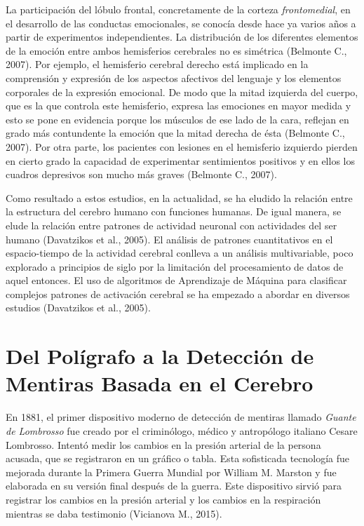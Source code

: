 La participación del lóbulo frontal, concretamente de la corteza \textit{frontomedial}, en el desarrollo de las conductas  emocionales, se conocía  desde  hace ya varios años a partir de experimentos independientes. La distribución de los diferentes elementos de la emoción entre ambos hemisferios cerebrales no es simétrica (Belmonte C., 2007). Por ejemplo, el hemisferio cerebral derecho está implicado en la comprensión y expresión de los aspectos afectivos del lenguaje y los elementos corporales de la expresión emocional. De modo que la mitad izquierda del cuerpo, que es la que controla  este  hemisferio,  expresa  las  emociones en mayor medida y esto se pone en evidencia porque los músculos de ese lado de la cara, reflejan en grado más contundente la emoción que la mitad derecha de ésta (Belmonte C., 2007). Por otra parte, los pacientes con lesiones en el hemisferio izquierdo pierden en cierto grado la capacidad  de  experimentar sentimientos  positivos  y  en  ellos  los  cuadros  depresivos son mucho más graves (Belmonte C., 2007).

Como resultado a estos estudios, en la actualidad, se ha eludido la relación entre la estructura del cerebro humano con funciones humanas. De igual manera, se elude la relación entre patrones de actividad neuronal con actividades del ser humano (Davatzikos et al., 2005). El análisis de patrones cuantitativos en el espacio-tiempo de la actividad cerebral conlleva a un análisis multivariable, poco explorado a principios de siglo por la limitación del procesamiento de datos de aquel entonces. El uso de algoritmos de Aprendizaje de Máquina para clasificar complejos patrones de activación cerebral se ha empezado a abordar en diversos estudios (Davatzikos et al., 2005).

\section{Del Polígrafo a la Detección de Mentiras Basada en el Cerebro}
En 1881, el primer dispositivo moderno de detección de mentiras llamado \textit{Guante de Lombrosso} fue creado por el criminólogo, médico y antropólogo italiano Cesare Lombrosso. Intentó medir los cambios en la presión arterial de la persona acusada, que se registraron en un gráfico o tabla. Esta sofisticada tecnología fue mejorada durante la Primera Guerra Mundial por William M. Marston y fue elaborada en su versión final después de la guerra. Este dispositivo sirvió para registrar los cambios en la presión arterial y los cambios en la respiración mientras se daba testimonio (Vicianova M., 2015).  

